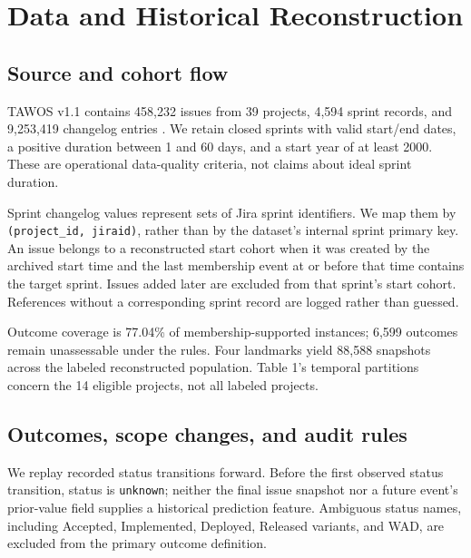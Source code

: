\section{Data and Historical Reconstruction}\label{data-and-historical-reconstruction}

\subsection{Source and cohort flow}\label{source-and-cohort-flow}

TAWOS v1.1 contains 458,232 issues from 39 projects, 4,594 sprint records, and 9,253,419 changelog entries \cite{tawosv11}. We retain closed sprints with valid start/end dates, a positive duration between 1 and 60 days, and a start year of at least 2000. These are operational data-quality criteria, not claims about ideal sprint duration.

Sprint changelog values represent sets of Jira sprint identifiers. We map them by \texttt{(project\_\allowbreak{}id,\ jiraid)}, rather than by the dataset's internal sprint primary key. An issue belongs to a reconstructed start cohort when it was created by the archived start time and the last membership event at or before that time contains the target sprint. Issues added later are excluded from that sprint's start cohort. References without a corresponding sprint record are logged rather than guessed.

{\def\LTcaptype{table}

}

Outcome coverage is 77.04\% of membership-supported instances; 6,599 outcomes remain unassessable under the rules. Four landmarks yield 88,588 snapshots across the labeled reconstructed population. Table 1's temporal partitions concern the 14 eligible projects, not all labeled projects.

\subsection{Outcomes, scope changes, and audit rules}\label{outcomes-scope-changes-and-audit-rules}

We replay recorded status transitions forward. Before the first observed status transition, status is \texttt{unknown}; neither the final issue snapshot nor a future event's prior-value field supplies a historical prediction feature. Ambiguous status names, including Accepted, Implemented, Deployed, Released variants, and WAD, are excluded from the primary outcome definition.

